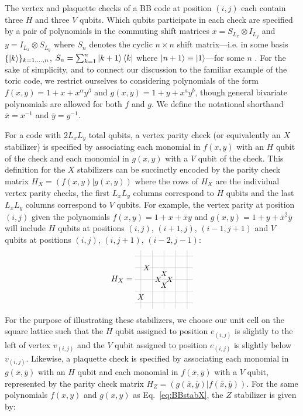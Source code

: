 \documentclass[aps,prx,reprint,superscriptaddress,nofootinbib]{revtex4-2}
\theoremstyle{definition}
\newcommand{\<}{\langle}
\renewcommand{\>}{\rangle}
\begin{document}
The vertex and plaquette checks of a BB code at position $(i,j)$ each contain three $H$ and three $V$ qubits. Which qubits participate in each check are specified by a pair of polynomials in the commuting shift matrices $x=S_{L_x}\otimes I_{L_y}$ and $y=I_{L_x}\otimes S_{L_y}$ where $S_{n}$ denotes the cyclic $n\times n$ shift matrix---i.e. in some basis $\{\ket{k}\}_{k = 1,...,n}$, $S_{n} = \sum_{k = 1}^{n} \ket{k + 1} \bra{k}$ where $\ket{n+1} \equiv \ket{1}$---for some $n$ \cite{Haah_2013}.
%
For the sake of simplicity, and to connect our discussion to the familiar example of the toric code, we restrict ourselves to considering polynomials of the form $f(x,y)=1+x+x^\alpha y^\beta$ and $g(x,y)=1+y+x^a y^b$, though general bivariate polynomials are allowed for both $f$ and $g$. We define the notational shorthand $\bar{x} = x^{-1}$ and $\bar{y} = y^{-1}$.
%

For a code with $2L_{x}L_y$ total qubits, a vertex parity check (or equivalently an $X$ stabilizer) is specified by associating each monomial in $f(x,y)$ with an $H$ qubit of the check and each monomial in $g(x,y)$ with a $V$ qubit of the check. This definition for the $X$ stabilizers can be succinctly encoded by the parity check matrix $H_X=\left(f(x,y)|g(x,y) \right)$ where the rows of $H_X$ are the individual vertex parity checks, the first $L_xL_y$ columns correspond to $H$ qubits and the last $L_xL_y$ columns correspond to $V$ qubits. For example, the vertex parity at position $(i,j)$ given the polynomials $f(x,y)=1+x+\bar{x}y$ and $g(x,y)=1+y+\bar{x}^2\bar{y}$ will include $H$ qubits at positions $(i,j)$, $(i+1,j)$, $(i-1,j+1)$ and $V$ qubits at positions $(i,j)$, $(i,j+1)$, $(i-2,j-1)$:
\begin{equation}\label{eq:BBstabX}
H_X = \begin{tikzpicture}[scale = 0.5, baseline = {([yshift=-.5ex]current bounding box.center)}]
        \foreach \i in {0, 1, 2, 3, 4}{
            \draw[color = lightgray] (\i, -0.5) -- (\i, 4.5);}
        \foreach \i in {0, 1, 2, 3, 4}{
            \draw[color = lightgray] (-0.5, \i) -- (4.5, \i);}  
        \node at (1.5, 2) {\small $X$};
        \node at (2.5, 2) {\small $X$};
        \node at (2, 2.5) {\small $X$};
        \node at (2, 1.5) {\small $X$};
        \node at (0.5, 3) {\small $X$};
        \node at (0, 0.5) {\small $X$};
\end{tikzpicture}
\end{equation}
%
For the purpose of illustrating these stabilizers, we choose our unit cell on the square lattice such that the $H$ qubit assigned to position $e_{(i,j)}$ is slightly to the left of vertex $v_{(i,j)}$ and the $V$ qubit assigned to position $e_{(i,j)}$ is slightly below $v_{(i,j)}$. Likewise, a plaquette check is specified by associating each monomial in $g(\overline{x},\overline{y})$ with an $H$ qubit and each monomial in $f(\overline{x},\overline{y})$ with a $V$ qubit, represented by the parity check matrix $H_Z=\left(g(\bar{x},\bar{y})|f(\bar{x},\bar{y}) \right)$. For the same polynomials $f(x,y)$ and $g(x,y)$ as Eq.~\eqref{eq:BBstabX}, the $Z$ stabilizer is given by:
%
\end{document}
